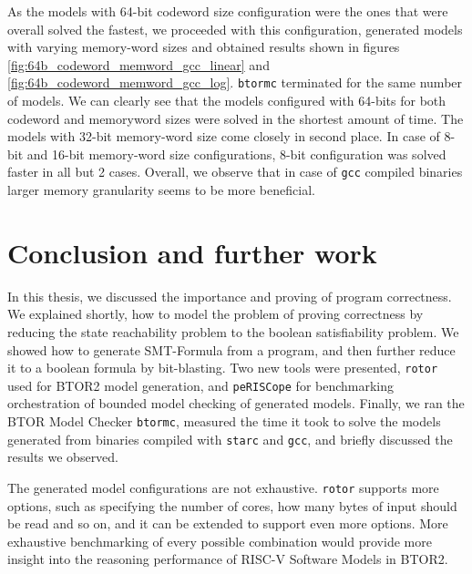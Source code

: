 \documentclass[12pt]{article}
\begin{document}
As the models with 64-bit codeword size configuration were the ones that were
overall solved the fastest, we proceeded with this configuration, generated
models with varying memory-word sizes and obtained results shown in figures
\ref{fig:64b_codeword_memword_gcc_linear} and
\ref{fig:64b_codeword_memword_gcc_log}. \texttt{btormc} terminated for the same
number of models. We can clearly see that the models configured with 64-bits
for both codeword and memoryword sizes were solved in the shortest amount of
time. The models with 32-bit memory-word size come closely in second place. In
case of 8-bit and 16-bit memory-word size configurations, 8-bit configuration
was solved faster in all but 2 cases. Overall, we observe that in case of
\texttt{gcc} compiled binaries larger memory granularity seems to be more
beneficial.

\section{Conclusion and further work}

In this thesis, we discussed the importance and proving of program correctness.
We explained shortly, how to model the problem of proving correctness by
reducing the state reachability problem to the boolean satisfiability problem.
We showed how to generate SMT-Formula from a program, and then further reduce
it to a boolean formula by bit-blasting. Two new tools were presented,
\texttt{rotor} used for BTOR2 model generation, and \texttt{peRISCope} for
benchmarking orchestration of bounded model checking of generated models.
Finally, we ran the BTOR Model Checker \texttt{btormc}, measured the time it
took to solve the models generated from binaries compiled with \texttt{starc}
and \texttt{gcc}, and briefly discussed the results we observed.

The generated model configurations are not exhaustive. \texttt{rotor} supports
more options, such as specifying the number of cores, how many bytes of input
should be read and so on, and it can be extended to support even more options.
More exhaustive benchmarking of every possible combination would provide more
insight into the reasoning performance of RISC-V Software Models in BTOR2.


\end{document}
